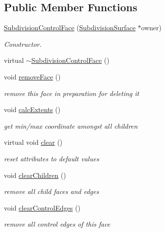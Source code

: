 \subsection*{Public Member Functions}
\begin{DoxyCompactItemize}
\item 
\hyperlink{classShipCAD_1_1SubdivisionControlFace_a9316495869082b0e3e27092118913644}{Subdivision\+Control\+Face} (\hyperlink{classShipCAD_1_1SubdivisionSurface}{Subdivision\+Surface} $\ast$owner)
\begin{DoxyCompactList}\small\item\em Constructor. \end{DoxyCompactList}\item 
virtual \hyperlink{classShipCAD_1_1SubdivisionControlFace_a1e94611e4050ee3b5b5779f087a9ddaf}{$\sim$\+Subdivision\+Control\+Face} ()
\item 
void \hyperlink{classShipCAD_1_1SubdivisionControlFace_a24902b9fafc77d4129cab481aac22c48}{remove\+Face} ()
\begin{DoxyCompactList}\small\item\em remove this face in preparation for deleting it \end{DoxyCompactList}\item 
void \hyperlink{classShipCAD_1_1SubdivisionControlFace_a611c74ce3f346a745d4a694f5aab4ec2}{calc\+Extents} ()
\begin{DoxyCompactList}\small\item\em get min/max coordinate amongst all children \end{DoxyCompactList}\item 
virtual void \hyperlink{classShipCAD_1_1SubdivisionControlFace_ad168e31f0ef2537b3cd0f58b0c1c54e2}{clear} ()
\begin{DoxyCompactList}\small\item\em reset attributes to default values \end{DoxyCompactList}\item 
void \hyperlink{classShipCAD_1_1SubdivisionControlFace_a1501212af025c7e33ede929d50a76651}{clear\+Children} ()
\begin{DoxyCompactList}\small\item\em remove all child faces and edges \end{DoxyCompactList}\item 
void \hyperlink{classShipCAD_1_1SubdivisionControlFace_a390a79e26ced82b4a879aebd0c1dc862}{clear\+Control\+Edges} ()
\begin{DoxyCompactList}\small\item\em remove all control edges of this face \end{DoxyCompactList}\item 

\end{DoxyCompactItemize}
